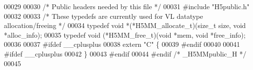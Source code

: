 \begin{DoxyCode}
00029 
00030 \textcolor{comment}{/* Public headers needed by this file */}
00031 \textcolor{preprocessor}{#include "H5public.h"}
00032 
00033 \textcolor{comment}{/* These typedefs are currently used for VL datatype allocation/freeing */}
00034 \textcolor{keyword}{typedef} \textcolor{keywordtype}{void} *(*H5MM\_allocate\_t)(\textcolor{keywordtype}{size\_t} size, \textcolor{keywordtype}{void} *alloc\_info);
00035 \textcolor{keyword}{typedef} void (*H5MM\_free\_t)(\textcolor{keywordtype}{void} *mem, \textcolor{keywordtype}{void} *free\_info);
00036 
00037 \textcolor{preprocessor}{#ifdef \_\_cplusplus}
00038 \textcolor{keyword}{extern} \textcolor{stringliteral}{"C"} \{
00039 \textcolor{preprocessor}{#endif}
00040 
00041 \textcolor{preprocessor}{#ifdef \_\_cplusplus}
00042 \}
00043 \textcolor{preprocessor}{#endif}
00044 \textcolor{preprocessor}{#endif }\textcolor{comment}{/* \_H5MMpublic\_H */}\textcolor{preprocessor}{}
00045 
\end{DoxyCode}
